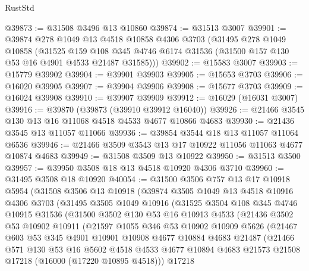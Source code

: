 \begin{lexlean}{RustStd}
\begin{coremodule}
@39873 := @31508 @3496 @13 @10860
@39874 := @31513 @3007
@39901 := @39874
    @278
    @1049
    @13
    @4518
    @10858
    @4306
    @3703
    (@31495
      @278
      @1049
      @10858
      (@31525
        @159
        @108
        @345
        @4746
        @6174
        @31536
        (@31500 @157 @130 @53 @16 @4901 @4533 @21487 @31585)))
@39902 := @15583 @3007
@39903 := @15779 @39902
@39904 := @39901 @39903
@39905 := @15653 @3703
@39906 := @16020 @39905
@39907 := @39904 @39906
@39908 := @15677 @3703
@39909 := @16024 @39908
@39910 := @39907 @39909
@39912 := @16029 (@16031 @3007)
@39916 := @39870 (@39873 (@39910 @39912 @16040))
@39926 := @21466 @3545 @130 @13 @16 @11068 @4518 @4533 @4677 @10866 @4683
@39930 := @21436 @3545 @13 @11057 @11066
@39936 := @39854 @3544 @18 @13 @11057 @11064 @6536
@39946 := @21466 @3509 @3543 @13 @17 @10922 @11056 @11063 @4677 @10874 @4683
@39949 := @31508 @3509 @13 @10922
@39950 := @31513 @3500
@39957 := @39950 @3508 @18 @13 @4518 @10920 @4306 @3710
@39960 := @31495 @3508 @18 @10920
@40054 := @31500
    @3506
    @757
    @13
    @17
    @10918
    @5954
    (@31508
      @3506
      @13
      @10918
      (@39874
        @3505
        @1049
        @13
        @4518
        @10916
        @4306
        @3703
        (@31495
          @3505
          @1049
          @10916
          (@31525
            @3504
            @108
            @345
            @4746
            @10915
            @31536
            (@31500
              @3502
              @130
              @53
              @16
              @10913
              @4533
              (@21436
                @3502
                @53
                @10902
                @10911
                (@21597
                  @1055
                  @346
                  @53
                  @10902
                  @10909
                  @5626
                  (@21467
                    @603
                    @53
                    @345
                    @4901
                    @10901
                    @10908
                    @4677
                    @10884
                    @4683
                    @21487
                    (@21466
                      @571
                      @130
                      @53
                      @16
                      @5602
                      @4518
                      @4533
                      @4677
                      @10894
                      @4683
                      @21573
                      @21508
                      @17218
                      (@16000 (@17220 @10895 @4518)))
                    @17218

\end{coremodule}
\end{lexlean}
